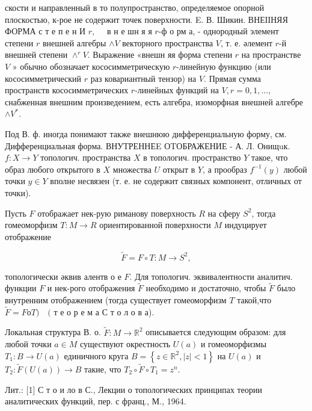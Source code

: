 \documentclass[10pt]{article}
\begin{document}
скости и направленный в то полупространство, определяемое опорной плоскостью, к-рое не содержит точек поверхности. E. В. Шикин. ВНЕІІНЯЯ ФОРМА с т е п е н И $r, \quad$ в н е шн я я $r$-ф о рм а, - однородный элемент степени $r$ внешней алгебры $\wedge V$ векторного пространства $V$, т. е. әлемент $r$-й внешней степени $\wedge^{r} V$. Выражение «внешн яя форма степени $r$ на пространстве $V$ » обычно обозначает кососимметрическую $r$-линейную функцию (или кососимметрический $r$ раз ковариантный тензор) на $V$. Прямая сумма пространств кососимметрических $r$-линейных функций на $V, r=0,1, \ldots$, снабженная внешним произведением, есть алгебра, изоморфная внешней алгебре $\wedge V^{*}$.



Под В. ф. иногда понимают также внешнюю дифференциальную форму, см. Дифференциальная форма. ВНУТРЕННЕE ОTОБРАЖЕНИЕ - А. Л. Онищuк. $f: X \rightarrow Y$ топологич. пространства $X$ в топологич. пространство $Y$ такое, что образ любого открытого в $X$ множества $U$ открыт в $Y$, а прообраз $f^{-1}(y)$ любой точки $y \in Y$ вполне несвязен (т. е. не содержит связных компонент, отличных от точки).



Пусть $F$ отображает нек-рую риманову поверхность $R$ на сферу $S^{2}$, тогда гомеоморфизм $T: M \rightarrow R$ ориентированной поверхности $M$ индуцирует отображение



\[

\tilde{F}=F \circ T: M \rightarrow S^{2},

\]



топологически әквив алентв о е $F$. Для топологич. эквивалентности аналитич. функции $F$ и нек-рого отображения $\tilde{F}$ необходимо и достаточно, чтобы $\tilde{F}$ было внутренним отображением (тогда существует гомеоморфизм $T$ такой,что $\tilde{F}=F о T) \quad($ т е о р е м а С т о л о в а).



Локальная структура В. о. $\tilde{F}: M \rightarrow \mathbb{R}^{2}$ описывается следующим образом: для любой точки $a \in M$ существуют окрестность $U(a)$ и гомеоморфизмы $T_{1}: B \rightarrow U(a)$ единичного круга $B=\left\{z \in \mathbb{R}^{2},|z|<1\right\}$ на $U(a)$ и $T_{2}: \tilde{F}(U(a)) \rightarrow B$ такие, что $T_{2} \circ \tilde{F} \circ T_{1}=z^{n}$.



Лит.: [1] С т о и ло в С., Лекции о топологических принципах теории аналитических функций, пер. с франц., М., 1964.
\end{document}
